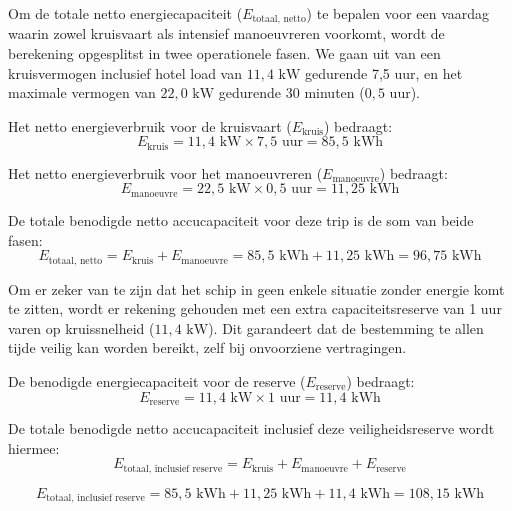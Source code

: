\noindent Om de totale netto energiecapaciteit ($E_{\text{totaal, netto}}$) te bepalen voor een vaardag waarin zowel kruisvaart als intensief manoeuvreren voorkomt, wordt de berekening opgesplitst in twee operationele fasen. We gaan uit van een kruisvermogen inclusief hotel load van $11{,}4 \text{ kW}$ gedurende 7,5 uur, en het maximale vermogen van $22{,}0 \text{ kW}$ gedurende 30 minuten ($0{,}5 \text{ uur}$).

\noindent Het netto energieverbruik voor de kruisvaart ($E_{\text{kruis}}$) bedraagt:
\begin{equation}
E_{\text{kruis}} = 11{,}4 \text{ kW} \times 7{,}5 \text{ uur} = 85{,}5 \text{ kWh}
\end{equation}

\noindent Het netto energieverbruik voor het manoeuvreren ($E_{\text{manoeuvre}}$) bedraagt:
\begin{equation}
E_{\text{manoeuvre}} = 22{,}5 \text{ kW} \times 0{,}5 \text{ uur} = 11{,}25 \text{ kWh}
\end{equation}

\noindent De totale benodigde netto accucapaciteit voor deze trip is de som van beide fasen:
\begin{equation}
E_{\text{totaal, netto}} = E_{\text{kruis}} + E_{\text{manoeuvre}} = 85{,}5 \text{ kWh} + 11{,}25 \text{ kWh} = 96{,}75 \text{ kWh}
\end{equation}

\noindent Om er zeker van te zijn dat het schip in geen enkele situatie zonder energie komt te zitten, wordt er rekening gehouden met een extra capaciteitsreserve van 1 uur varen op kruissnelheid ($11{,}4 \text{ kW}$). Dit garandeert dat de bestemming te allen tijde veilig kan worden bereikt, zelf bij onvoorziene vertragingen.

\noindent De benodigde energiecapaciteit voor de reserve ($E_{\text{reserve}}$) bedraagt:
\begin{equation}
E_{\text{reserve}} = 11{,}4 \text{ kW} \times 1 \text{ uur} = 11{,}4 \text{ kWh}
\end{equation}

\noindent De totale benodigde netto accucapaciteit inclusief deze veiligheidsreserve wordt hiermee:
\begin{equation}
E_{\text{totaal, inclusief reserve}} = E_{\text{kruis}} + E_{\text{manoeuvre}} + E_{\text{reserve}}
\end{equation}

\begin{equation}
E_{\text{totaal, inclusief reserve}} = 85{,}5 \text{ kWh} + 11{,}25 \text{ kWh} + 11{,}4 \text{ kWh} = 108{,}15 \text{ kWh}
\end{equation}


